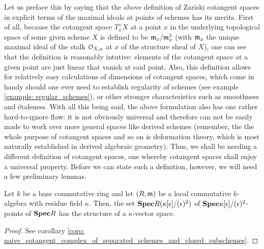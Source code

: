             \begin{remark}
                Let us preface this by saying that the above definition of Zariski cotangent spaces in explicit terms of the maximal ideals at points of schemes has its merits. First of all, because the cotangent space $T^{\vee}_xX$ at a point $x$ in the underlying topological space of some given scheme $X$ is defined to be $\mathfrak{m}_x/\mathfrak{m}_x^2$ (with $\mathfrak{m}_x$ the unique maximal ideal of the stalk $\mathcal{O}_{X, x}$ at $x$ of the structure sheaf of $X$), one can see that the definition is reasonably intutive: elements of the cotangent space at a given point are just linear  that vanish at said point. Also, this definition allows for relatively easy calculations of dimensions of cotangent spaces, which come in handy should one ever need to establish regularity of schemes (see example \ref{example: regular_schemes}), or other stronger characteristics such as smoothness and \'etaleness. With all this being said, the above formulation also has one rather hard-to-ignore flaw: it is not obviously universal and therefore can not be easily made to work over more general spaces like derived schemes (remember, the the whole purpose of cotangent spaces and so on is deformation theory, which is most naturally established in derived algebraic geometry). Thus, we shall be needing a different definition of cotangent spaces, one whereby cotangent spaces shall enjoy a universal property. Before we can state such a definition, however, we will need a few preliminary lemmas.
            \end{remark}
            
            \begin{lemma} \label{lemma: vector_space_structure_on_dual_number_points}
                Let $k$ be a base commutative ring and let $(R, \mathfrak{m})$ be a local commutative $k$-algebra with residue field $\kappa$. Then, the set $\mathbf{Spec} R(\kappa[\epsilon]/(\epsilon)^2)$ of $\mathbf{Spec} \kappa[\epsilon]/(\epsilon)^2$-points of $\mathbf{Spec} R$ has the structure of a $\kappa$-vector space. 
            \end{lemma}
                \begin{proof}
                    See corollary \ref{coro: naive_cotangent_complex_of_separated_schemes_and_closed_subschemes}.
                \end{proof}
            
